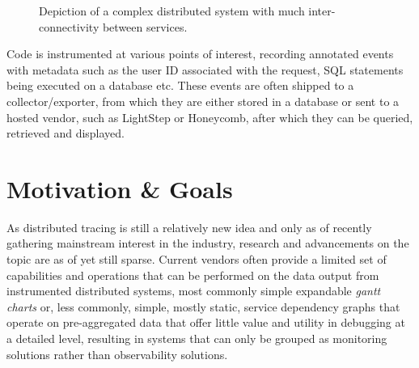 \documentclass[12pt,pdftex,titlepage]{report}
\begin{document}
            \begin{figure}[hbt!]
                \centering
                \caption{Depiction of a complex distributed system with much inter-connectivity between services.}
                \label{fig:dist}
            \end{figure}

            Code is instrumented at various points of interest, recording annotated events with metadata such as the user ID associated with the request, SQL statements being 
            executed on a database etc. These events are often shipped to a collector/exporter, from which they are either stored in a database or sent to a hosted vendor, such as
            LightStep or Honeycomb, after which they can be queried, retrieved and displayed.

        \section{Motivation \& Goals}
            As distributed tracing is still a relatively new idea and only as of recently gathering mainstream interest in the industry, research and advancements on the topic are 
            as of yet still sparse. Current vendors often provide a limited set of capabilities and operations that can be performed on the data output from instrumented distributed systems,
            most commonly simple expandable \textit{gantt charts} or, less commonly, simple, mostly static, service dependency graphs that operate on pre-aggregated data that offer little 
            value and utility in debugging at a detailed level, resulting in systems that can only be grouped as monitoring solutions rather than observability solutions.
            
\end{document}

